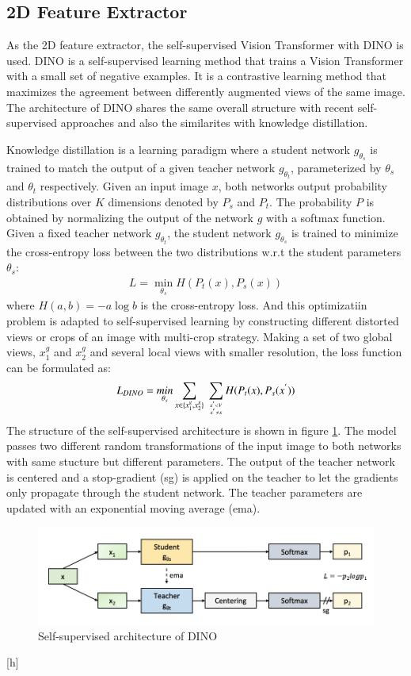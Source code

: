 \documentclass[12pt,DIV14,BCOR12mm,a4paper,footinclude=false,headinclude,parskip=half-,twoside,openright,cleardoublepage=empty,toc=index,bibliography=totoc,listof=totoc]{scrreprt}
\numberwithin{equation}{chapter}
\begin{document}
\subsection{2D Feature Extractor}
As the 2D feature extractor, the self-supervised Vision Transformer
 with DINO\cite{caron2021emerging} is used. DINO is a self-supervised learning method that trains a Vision Transformer
 with a small set of negative examples. It is a contrastive learning method that maximizes the agreement between differently augmented views of the same image. The architecture of DINO shares the same overall structure with recent self-supervised approaches and also the similarites with knowledge distillation.

Knowledge distillation is a learning paradigm where a student network $g_{\theta_{s}}$ is trained to match the output of a given teacher network $g_{\theta_{t}}$, parameterized by $\theta_{s}$ and $\theta_{t}$ respectively. Given an input image $x$, both networks output probability distributions over $K$ dimensions denoted by $P_{s}$ and $P_{t}$. The probability $P$ is obtained by normalizing the output of the network $g$ with a softmax function. Given a fixed teacher network $g_{\theta_{t}}$, the student network $g_{\theta_{s}}$ is trained to minimize the cross-entropy loss between the two distributions w.r.t the student parameters $\theta_{s}$:
\begin{align}
  L = \mathop{min}_{\theta_{s}}H(P_{t}(x), P_{s}(x))
\end{align}
where $H(a,b)=-a \log b$ is the cross-entropy loss. And this optimizatiin problem is adapted to self-supervised learning by constructing different distorted views or crops of an image with multi-crop strategy. Making a set of two global views, $x_{1}^{g}$ and $x_{2}^{g}$ and several local views with smaller resolution, the loss function can be formulated as:
\begin{align}
  L_{DINO}=\mathop{min}_{\theta_{s}}\mathop{\sum}_{x\in \{x_{1}^{g},x_{2}^{g}\}} \ \mathop{\sum}_{x^{'}\in V \atop x^{'}\neq x}H(P_{t}(x), P_{s}(x^{'}))
\end{align}
The structure of the self-supervised architecture is shown in figure \ref{img:dino}. The model passes two different random transformations of the input image to both networks with same stucture but different parameters. The output of the teacher network is centered and a stop-gradient (sg) is applied on the teacher to let the gradients only propagate through the student network. The teacher parameters are updated with an exponential moving average (ema).
\begin{figure}
	\centering
	\includegraphics[scale=.38]{img/dino.png}
	\caption{Self-supervised architecture of DINO}
	\label{img:dino}
\end{figure}[h]
\end{document}
